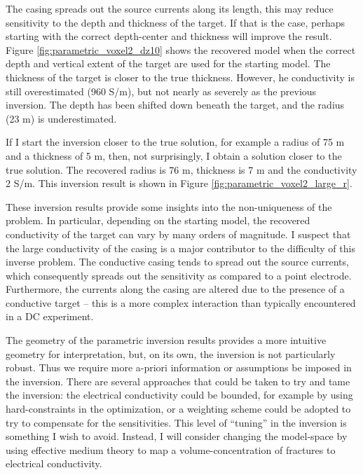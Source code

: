 The casing spreads out the source currents along its length, this may reduce sensitivity to the depth and thickness of the target. If that is the case, perhaps starting with the correct depth-center and thickness will improve the result. Figure \ref{fig:parametric_voxel2_dz10} shows the recovered model when the correct depth and vertical extent of the target are used for the starting model. The thickness of the target is closer to the true thickness. However, he conductivity is still overestimated (960 S/m), but not nearly as severely as the previous inversion. The depth has been shifted down beneath the target, and the radius (23 m) is underestimated.




If I start the inversion closer to the true solution, for example a radius of 75 m and a thickness of 5 m, then, not surprisingly, I obtain a solution closer to the true solution. The recovered radius is 76 m, thickness is 7 m and the conductivity 2 S/m. This inversion result is shown in Figure \ref{fig:parametric_voxel2_large_r}.




These inversion results provide some insights into the non-uniqueness of the problem. In particular, depending on the starting model, the recovered conductivity of the target can vary by many orders of magnitude. I suspect that the large conductivity of the casing is a major contributor to the difficulty of this inverse problem. The conductive casing tends to spread out the source currents, which consequently spreads out the sensitivity as compared to a point electrode. Furthermore, the currents along the casing are altered due to the presence of a conductive target -- this is a more complex interaction than typically encountered in a DC experiment.

The geometry of the parametric inversion results provides a more intuitive geometry for interpretation, but, on its own, the inversion is not particularly robust. Thus we require more a-priori information or assumptions be imposed in the inversion. There are several approaches that could be taken to try and tame the inversion: the electrical conductivity could be bounded, for example by using hard-constraints in the optimization, or a weighting scheme could be adopted to try to compensate for the sensitivities. This level of ``tuning'' in the inversion is something I wish to avoid. Instead, I will consider changing the model-space by using effective medium theory to map a volume-concentration of fractures to electrical conductivity.


